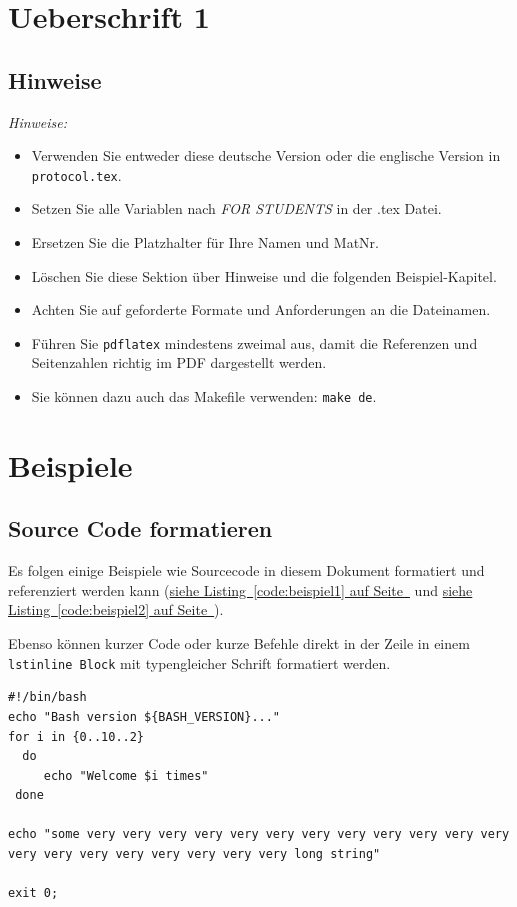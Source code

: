 \documentclass[12pt,a4paper,titlepage,oneside]{scrartcl}
\begin{document}
\section{Ueberschrift 1}

\subsection{Hinweise}
\emph{Hinweise:}
\begin{itemize}
    \item Verwenden Sie entweder diese deutsche Version oder die englische Version in \lstinline{protocol.tex}.
    \item Setzen Sie alle Variablen nach \emph{FOR STUDENTS} in der .tex Datei.
    \item Ersetzen Sie die Platzhalter für Ihre Namen und MatNr.
    \item Löschen Sie diese Sektion über Hinweise und die folgenden Beispiel-Kapitel.
    \item Achten Sie auf geforderte Formate und Anforderungen an die Dateinamen.
    \item Führen Sie \lstinline{pdflatex} mindestens zweimal aus, damit die Referenzen und Seitenzahlen richtig im PDF dargestellt werden.
    \item Sie können dazu auch das Makefile verwenden: \lstinline{make de}.
\end{itemize}

\section{Beispiele}

\subsection{Source Code formatieren}
Es folgen einige Beispiele wie Sourcecode in diesem Dokument formatiert und referenziert werden kann
(\hyperref[code:beispiel1]{siehe Listing~\ref*{code:beispiel1} auf Seite~\pageref*{code:beispiel1}} und \hyperref[code:beispiel2]{siehe Listing~\ref*{code:beispiel2} auf Seite~\pageref*{code:beispiel2}}).

Ebenso können kurzer Code oder kurze Befehle direkt in der Zeile in einem \lstinline{lstinline Block} mit typengleicher Schrift formatiert werden.



\begin{lstlisting}[caption=Example bash script,label=code:beispiel2,style=simple]
#!/bin/bash
echo "Bash version ${BASH_VERSION}..."
for i in {0..10..2}
  do
     echo "Welcome $i times"
 done

echo "some very very very very very very very very very very very very very very very very very very very very long string"

exit 0;
\end{lstlisting}
\end{document}
